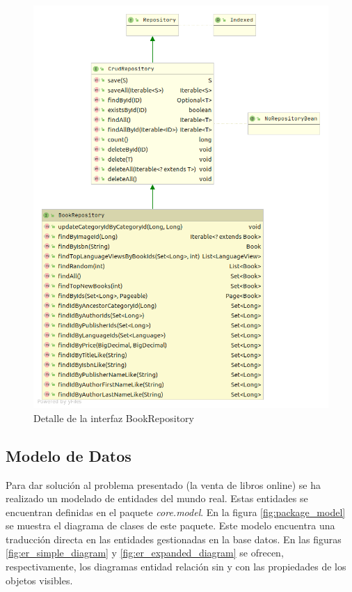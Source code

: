 \documentclass[a4paper]{article}
\begin{document}
   	\begin{figure}[htb!]
   		\centering
   		\includegraphics[width=\textwidth,keepaspectratio]{detail_bookRepository}
   		\caption{Detalle de la interfaz BookRepository}
   		\label{fig:detail_bookRepository}
   	\end{figure}
    	
    
    \subsection{Modelo de Datos}
    Para dar solución al problema presentado (la venta de libros online) se ha realizado un modelado de entidades del mundo real. Estas entidades se encuentran definidas en el paquete \emph{core.model}. En la figura \ref{fig:package_model} se muestra el diagrama de clases de este paquete. Este modelo encuentra una traducción directa en las entidades gestionadas en la base datos. En las figuras \ref{fig:er_simple_diagram} y \ref{fig:er_expanded_diagram} se ofrecen, respectivamente, los diagramas entidad relación sin y con las propiedades de los objetos visibles.
    
\end{document}
